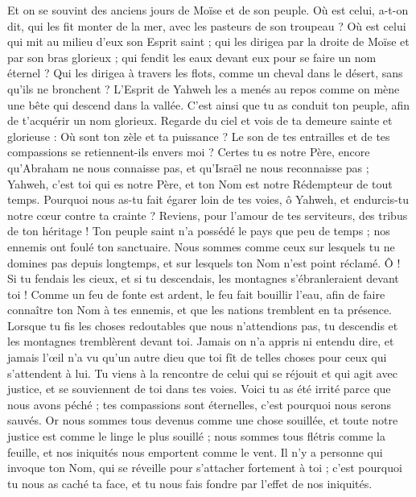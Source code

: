 \begin{multicols}{2}
Et on se souvint des anciens jours de Moïse et de son peuple. Où est celui, a-t-on dit, qui les fit monter de la mer, avec les pasteurs de son troupeau ? Où est celui qui mit au milieu d'eux son Esprit saint ;
qui les dirigea par la droite de Moïse et par son bras glorieux ; qui fendit les eaux devant eux pour se faire un nom éternel ?
Qui les dirigea à travers les flots, comme un cheval dans le désert, sans qu'ils ne bronchent ?
L'Esprit de Yahweh les a menés au repos comme on mène une bête qui descend dans la vallée. C'est ainsi que tu as conduit ton peuple, afin de t'acquérir un nom glorieux.
Regarde du ciel et vois de ta demeure sainte et glorieuse : Où sont ton zèle et ta puissance ? Le son de tes entrailles et de tes compassions se retiennent-ils envers moi ?
Certes tu es notre Père, encore qu'Abraham ne nous connaisse pas, et qu'Israël ne nous reconnaisse pas ; Yahweh, c'est toi qui es notre Père, et ton Nom est notre Rédempteur de tout temps.
Pourquoi nous as-tu fait égarer loin de tes voies, ô Yahweh, et endurcis-tu notre cœur contre ta crainte ? Reviens, pour l'amour de tes serviteurs, des tribus de ton héritage !
Ton peuple saint n'a possédé le pays que peu de temps ; nos ennemis ont foulé ton sanctuaire.
Nous sommes comme ceux sur lesquels tu ne domines pas depuis longtemps, et sur lesquels ton Nom n'est point réclamé. Ô ! Si tu fendais les cieux, et si tu descendais, les montagnes s'ébranleraient devant toi !
\VerseOne{}Comme un feu de fonte est ardent, le feu fait bouillir l'eau, afin de faire connaître ton Nom à tes ennemis, et que les nations tremblent en ta présence.
Lorsque tu fis les choses redoutables que nous n'attendions pas, tu descendis et les montagnes tremblèrent devant toi.
Jamais on n'a appris ni entendu dire, et jamais l'œil n'a vu qu'un autre dieu que toi fît de telles choses pour ceux qui s'attendent à lui.
Tu viens à la rencontre de celui qui se réjouit et qui agit avec justice, et se souviennent de toi dans tes voies. Voici tu as été irrité parce que nous avons péché ; tes compassions sont éternelles, c'est pourquoi nous serons sauvés.
Or nous sommes tous devenus comme une chose souillée, et toute notre justice est comme le linge le plus souillé ; nous sommes tous flétris comme la feuille, et nos iniquités nous emportent comme le vent.
Il n'y a personne qui invoque ton Nom, qui se réveille pour s'attacher fortement à toi ; c'est pourquoi tu nous as caché ta face, et tu nous fais fondre par l'effet de nos iniquités.

\end{multicols}
